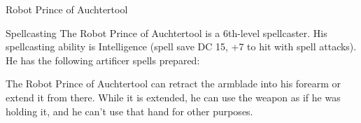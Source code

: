 \begin{DndMonster}[width=\textwidth + 8pt]{Robot Prince of Auchtertool}
\begin{multicols}{2}
		\DndMonsterAttack[
			name			= Lightning Launcher,
			distance		= ranged,	%
			mod				= +7,
			range			= 90/300,
			targets			= one target,
			dmg				= \DndDice{1d6 + 4},
			dmg-type		= Lightning,
			extra			= {. Once per turn the Robot Prince of Auchtertool can deal an additional \DndDice{1d6} Lightning damage to a target hit with this attack},
		]
		
		\begin{DndMonsterSpells}
			\item[Spellcasting] The Robot Prince of Auchtertool is a 6th-level spellcaster. His spellcasting ability is Intelligence (spell save DC 15, +7 to hit with spell attacks). He has the following artificer spells prepared:
		\end{DndMonsterSpells}
		
		The Robot Prince of Auchtertool can retract the armblade into his forearm or extend it from there. While it is extended, he can use the weapon as if he was holding it, and he can't use that hand for other purposes.
	\end{multicols}
\end{DndMonster}